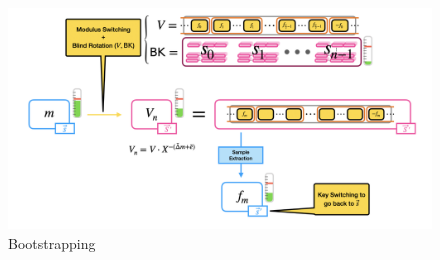 \documentclass{techrep}
\theoremstyle{definition}
\theoremstyle{plain}
\begin{document}
	\begin{figure}[H]
		\centering
	\includegraphics[width=1.1\columnwidth]{fig/boot_strapping.png}
		\caption{Bootstrapping}
		\label{fig:boot_strapping}
	\end{figure}
\end{document}
